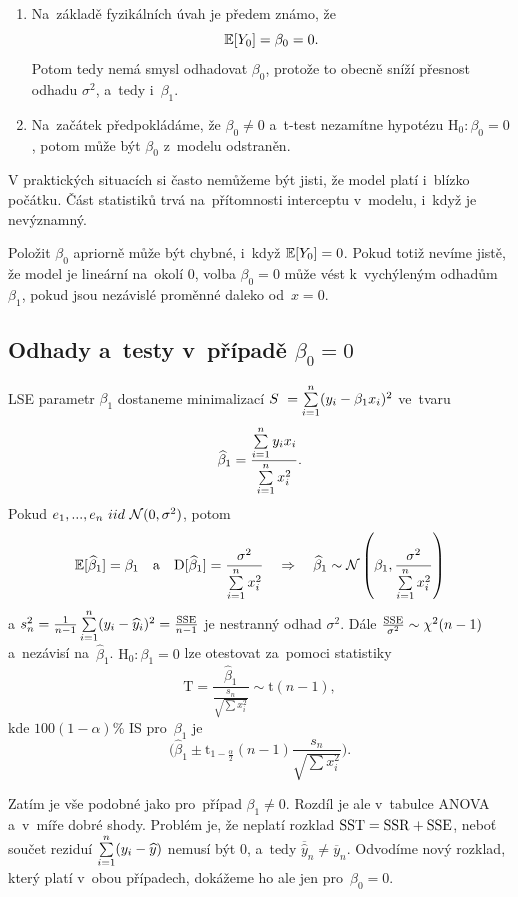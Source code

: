  \begin{enumerate}[1.]
  \item Na~základě fyzikálních úvah je předem známo, že
 $$
 \mathbb{E} [Y_0] = \beta_0 = 0.
 $$
		Potom tedy nemá smysl odhadovat $\beta_0$, protože to obecně sníží přesnost odhadu $\sigma^2$, a~tedy i~$\beta_1$.
  \item Na~začátek předpokládáme, že $\beta_0 \neq 0$ a~t-test nezamítne hypotézu $\text{H}_0 : \beta_0 = 0$, potom může být $\beta_0$ z~modelu odstraněn.
\end{enumerate}

\begin{remark}
V praktických situacích si často nemůžeme být jisti, že model platí i~blízko počátku. Část statistiků trvá na~přítomnosti interceptu v~modelu, i~když je nevýznamný.

Položit $\beta_0$ apriorně může být chybné, i~když $\mathbb{E} [Y_0] = 0$. Pokud totiž nevíme jistě, že model je lineární na~okolí 0, volba $\beta_0 = 0$ může vést k~vychýleným odhadům $\beta_1$, pokud jsou nezávislé proměnné daleko od~$x = 0$.
\end{remark}

\subsection{Odhady a~testy v~případě $\beta_0 = 0$ }
LSE parametr $\beta_1$ dostaneme minimalizací $S~ = \sum\limits_{i=1}^{n} (y_i - \beta_1 x_i)^2$ ve~tvaru
 $$
 \widehat{\beta}_1 = \frac{\sum\limits_{i=1}^{n} y_i  x_i }{\sum\limits_{i=1}^{n} x_i^2}.
 $$
Pokud $e_1,..., e_n~iid~\mathcal{N}(0,\sigma^2)$, potom 
$$\mathbb{E} [\widehat{\beta}_1] = \beta_1\quad\text{a}\quad\mathrm{D} [\widehat{\beta}_1] = \frac{\sigma^2}{\sum\limits_{i=1}^{n} x_i^2}\quad\Rightarrow\quad\widehat{\beta}_1 \sim \mathcal{N}\left(\beta_1, \frac{\sigma^2}{\sum\limits_{i=1}^{n} x_i^2}\right)$$
a $s_n^2 = \frac{1}{n-1}\sum\limits_{i=1}^{n} (y_i -  \widehat{y}_i)^2 = \frac{\mathrm{SSE}}{n-1}$ je nestranný odhad $\sigma^2$.
Dále $\frac{\mathrm{SSE}}{\sigma^2} \sim \chi^2(n-1)$ a~nezávisí na~$\widehat{\beta}_1$.
 $\text{H}_0 : \beta_1 = 0$ lze otestovat za~pomoci statistiky
 $$
  \mathrm{T} = \frac{\widehat{\beta}_1}{\frac{s_n}{\sqrt{\sum x_i^2}}} \sim \mathrm{t}(n-1),
 $$
kde $100(1-\alpha) \%$ IS pro~$\beta_1$ je $$\bigg(\widehat{\beta}_1 \pm \mathrm{t}_{1 - \frac{\alpha}{2}}(n-1)\frac{s_n}{\sqrt{\sum x_i^2}}\bigg).$$

Zatím je vše podobné jako pro~případ $\beta_1 \neq 0$. Rozdíl je ale v~tabulce ANOVA a~v~míře dobré shody. Problém je, že neplatí rozklad $\mathrm{SST} = \mathrm{SSR} + \mathrm{SSE}$, neboť součet reziduí $\sum\limits_{i=1}^{n} (y_i - \widehat{y})$ nemusí být 0, a~tedy $\overline{\widehat{y}}_n \neq \overline{y}_n$. Odvodíme nový rozklad, který platí v~obou případech, dokážeme ho ale jen pro~$\beta_0 = 0$.

